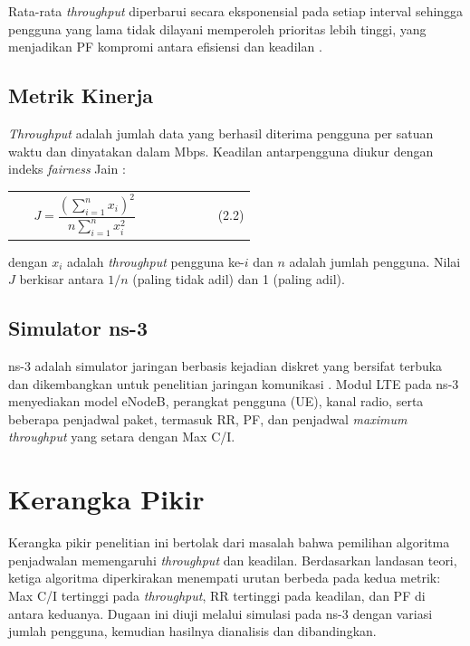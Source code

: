 Rata-rata \textit{throughput} diperbarui secara eksponensial pada setiap interval sehingga pengguna yang lama tidak dilayani memperoleh prioritas lebih tinggi, yang menjadikan PF kompromi antara efisiensi dan keadilan \parencite{capozzi2013}.

\subsection{Metrik Kinerja}
\textit{Throughput} adalah jumlah data yang berhasil diterima pengguna per satuan waktu dan dinyatakan dalam Mbps. Keadilan antarpengguna diukur dengan indeks \textit{fairness} Jain \parencite{jain1991}:

\begin{tanpagaris}
\begin{longtable}{@{}p{0.08\linewidth}p{0.76\linewidth}r@{}}
 & $J=\dfrac{\left(\sum_{i=1}^{n}x_{i}\right)^{2}}{n\sum_{i=1}^{n}x_{i}^{2}}$ & (2.2) \\
\end{longtable}
\end{tanpagaris}

dengan $x_{i}$ adalah \textit{throughput} pengguna ke-$i$ dan $n$ adalah jumlah pengguna. Nilai $J$ berkisar antara $1/n$ (paling tidak adil) dan 1 (paling adil).

\subsection{Simulator ns-3}
ns-3 adalah simulator jaringan berbasis kejadian diskret yang bersifat terbuka dan dikembangkan untuk penelitian jaringan komunikasi \parencite{ns3}. Modul LTE pada ns-3 menyediakan model eNodeB, perangkat pengguna (UE), kanal radio, serta beberapa penjadwal paket, termasuk RR, PF, dan penjadwal \textit{maximum throughput} yang setara dengan Max C/I.

\section{Kerangka Pikir}
Kerangka pikir penelitian ini bertolak dari masalah bahwa pemilihan algoritma penjadwalan memengaruhi \textit{throughput} dan keadilan. Berdasarkan landasan teori, ketiga algoritma diperkirakan menempati urutan berbeda pada kedua metrik: Max C/I tertinggi pada \textit{throughput}, RR tertinggi pada keadilan, dan PF di antara keduanya. Dugaan ini diuji melalui simulasi pada ns-3 dengan variasi jumlah pengguna, kemudian hasilnya dianalisis dan dibandingkan.
